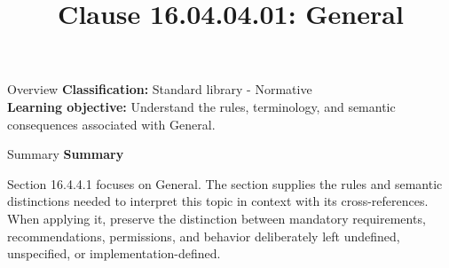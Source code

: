 \documentclass[10pt,letterpaper]{article}
\title{Clause 16.04.04.01: General}
\author{}
\date{}
\begin{document}
\maketitle
\begin{CornellOverviewBox}{Overview}
\textbf{Classification:} Standard library - Normative\\[2pt]
\textbf{Learning objective:} Understand the rules, terminology, and semantic consequences associated with General.
\end{CornellOverviewBox}\begin{CornellSummaryBox}{Summary}
{\sffamily\bfseries\color{Accent} Summary}\par\vspace{3pt}Section 16.4.4.1 focuses on General. The section supplies the rules and semantic distinctions needed to interpret this topic in context with its cross-references. When applying it, preserve the distinction between mandatory requirements, recommendations, permissions, and behavior deliberately left undefined, unspecified, or implementation-defined.
\end{CornellSummaryBox}
\end{document}
